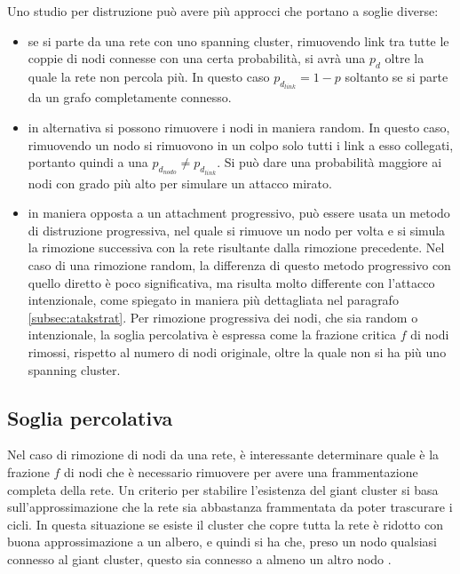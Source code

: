 Uno studio per distruzione pu\`o avere pi\`u approcci che portano a soglie diverse:
\begin{itemize}
 \item se si parte da una rete con uno spanning cluster, rimuovendo link tra tutte le coppie di nodi connesse con una certa probabilit\`a, si avr\`a una $p_d$ oltre la quale la rete non percola pi\`u. In questo caso $p_{d_{link}} = 1-p$ soltanto se si parte da un grafo completamente connesso.
 \item in alternativa si possono rimuovere i nodi in maniera random. In questo caso, rimuovendo un nodo si rimuovono in un colpo solo tutti i link a esso collegati, portanto quindi a una $p_{d_{nodo}} \neq p_{d_{link}}$. Si pu\`o dare una probabilit\`a maggiore ai nodi con grado pi\`u alto per simulare un attacco mirato.
 \item in maniera opposta a un attachment progressivo, pu\`o essere usata un metodo di distruzione progressiva, nel quale si rimuove un nodo per volta e si simula la rimozione successiva con la rete risultante dalla rimozione precedente. Nel caso di una rimozione random, la differenza di questo metodo progressivo con quello diretto \`e poco significativa, ma risulta molto differente con l'attacco intenzionale, come spiegato in maniera pi\`u dettagliata nel paragrafo \ref{subsec:atakstrat}. Per rimozione progressiva dei nodi, che sia random o intenzionale, la soglia percolativa \`e espressa come la frazione critica $f$ di nodi rimossi, rispetto al numero di nodi originale, oltre la quale non si ha pi\`u uno spanning cluster.
\end{itemize}

\subsection{Soglia percolativa} 
Nel caso di rimozione di nodi da una rete, \`e interessante determinare quale \`e la frazione $f$ di nodi che \`e necessario rimuovere per avere una frammentazione completa della rete. Un criterio per stabilire l'esistenza del giant cluster si basa sull'approssimazione che la rete sia abbastanza frammentata da poter trascurare i cicli. In questa situazione se esiste il cluster che copre tutta la rete \`e ridotto con buona approssimazione a un albero, e quindi si ha che, preso un nodo qualsiasi connesso al giant cluster, questo sia connesso a almeno un altro nodo \parencite{Cohen2000}. 

